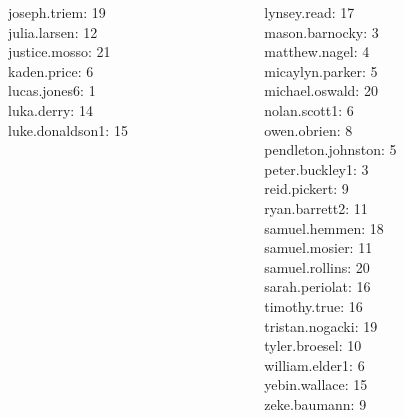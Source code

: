 \documentclass[10pt]{beamer}
\begin{document}
\begin{frame}
\begin{columns}
\begin{column}{0.33\textwidth}
joseph.triem: 19 \\ 
julia.larsen: 12 \\ 
justice.mosso: 21 \\ 
kaden.price: 6 \\ 
lucas.jones6: 1 \\ 
luka.derry: 14 \\ 
luke.donaldson1: 15 \\\end{column}
\begin{column}{0.33\textwidth}
lynsey.read: 17 \\ 
mason.barnocky: 3 \\ 
matthew.nagel: 4 \\ 
micaylyn.parker: 5 \\ 
michael.oswald: 20 \\ 
nolan.scott1: 6 \\ 
owen.obrien: 8 \\ 
pendleton.johnston: 5 \\ 
peter.buckley1: 3 \\ 
reid.pickert: 9 \\ 
ryan.barrett2: 11 \\ 
samuel.hemmen: 18 \\ 
samuel.mosier: 11 \\ 
samuel.rollins: 20 \\ 
sarah.periolat: 16 \\ 
timothy.true: 16 \\ 
tristan.nogacki: 19 \\ 
tyler.broesel: 10 \\ 
william.elder1: 6 \\ 
yebin.wallace: 15 \\ 
zeke.baumann: 9 \\\end{column}
\end{columns}
\vfill
\end{frame}
\end{document}
